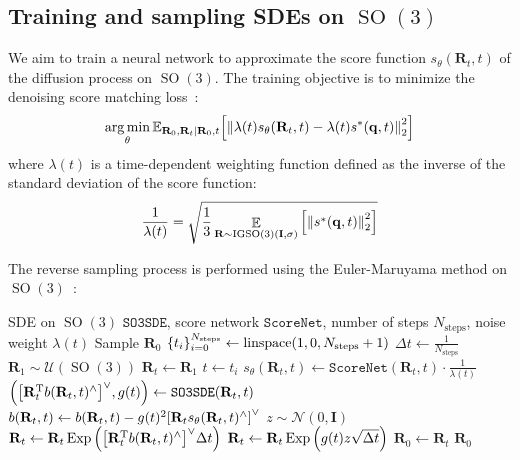 \documentclass{article}
\theoremstyle{plain}
\theoremstyle{definition}
\theoremstyle{remark}
\DeclareMathOperator{\SO}{SO}
\DeclareMathOperator{\IGSO}{IGSO}
\DeclareMathOperator{\Exp}{\operatorname{Exp}}
\DeclareMathOperator*{\argmin}{\operatorname{arg\,min}}
\DeclareMathOperator{\E}{\mathbb{E}}
\begin{document}
\subsection{Training and sampling SDEs on $\SO(3)$}

We aim to train a neural network to approximate the score function $s_\theta(\mathbf{R}_t, t)$ of the diffusion process on $\SO(3)$. The training objective is to minimize the denoising score matching loss~\cite{score_based_diffusion}:
\begin{equation}
    \argmin_\theta \mathbb{E}_{\mathbf{R}_0, \mathbf{R}_t\mid \mathbf{R}_0, t} \qty[\norm{\lambda(t) s_\theta(\mathbf{R}_t, t)-\lambda(t) s^*(\mathbf{q}, t)}^2_2]
\end{equation}
where $\lambda(t)$ is a time-dependent weighting function defined as the inverse of the standard deviation of the score function:
\begin{equation}
    \frac{1}{\lambda(t)} = \sqrt{\frac{1}{3}\E_{\mathbf{R}\sim \IGSO(3)(\mathbf{I}, \sigma)}\qty[\norm{s^*(\mathbf{q}, t)}_2^2]}
\end{equation}

The reverse sampling process is performed using the Euler-Maruyama method on $\SO(3)$~\cite{riemannian_diffusion}:
\begin{algorithm}[!ht]
    \caption{Euler-Maruyama Predictor on $\SO(3)$}\label{alg:em_predictor_so3}
    \begin{algorithmic}[1]
        \REQUIRE SDE on $\SO(3)$ $\texttt{SO3SDE}$, score network $\texttt{ScoreNet}$, number of steps $N_\text{steps}$, noise weight $\lambda(t)$
        \ENSURE Sample $\mathbf{R}_0$
        \STATE $\qty{t_i}_{i=0}^{N_\text{steps}} \leftarrow \mathrm{linspace}(1, 0, N_\text{steps}+1)$
        \STATE $\Delta t \leftarrow \frac{1}{N_\text{steps}}$
        \STATE $\mathbf{R}_1 \sim \mathcal{U}(\SO(3))$
        \STATE $\mathbf{R}_t \leftarrow \mathbf{R}_1$
        \STATE $t \leftarrow t_i$
        \STATE $s_\theta(\mathbf{R}_t, t) \leftarrow \texttt{ScoreNet}(\mathbf{R}_t, t)\cdot \frac{1}{\lambda(t)}$
        \STATE $\qty(\qty[\mathbf{R}_t^\mathrm{T} b(\mathbf{R}_t, t)^\wedge]^\vee,g(t)) \leftarrow \texttt{SO3SDE}(\mathbf{R}_t, t)$
        \STATE $b(\mathbf{R}_t, t) \leftarrow b(\mathbf{R}_t, t) - g(t)^2 \qty[\mathbf{R}_t s_\theta(\mathbf{R}_t, t)^\wedge]^\vee$
        \STATE $z \sim \mathcal{N}(0, \mathbf{I})$
        \STATE $\mathbf{R}_t \leftarrow \mathbf{R}_t \Exp\qty(\qty[\mathbf{R}_t^\mathrm{T} b(\mathbf{R}_t, t)^\wedge]^\vee\Delta t)$
        \STATE $\mathbf{R}_t \leftarrow \mathbf{R}_t \Exp\qty(g(t)z\sqrt{\Delta t})$
        \ENDFOR
        \STATE $\mathbf{R}_0 \leftarrow \mathbf{R}_t$
        \RETURN $\mathbf{R}_0$
    \end{algorithmic}
\end{algorithm}
\end{document}
